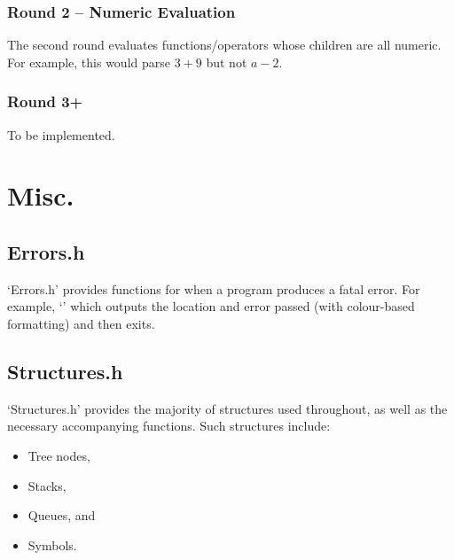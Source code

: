             \subsubsection{Round 2 -- Numeric Evaluation}
                The second round evaluates functions/operators whose children are all numeric. For example, this would parse $3 + 9$ but not $a - 2$. 

            \subsubsection{Round 3+}
                To be implemented.

    \section{Misc.}
        \subsection{Errors.h}
            `Errors.h' provides functions for when a program produces a fatal error. For example, `' which outputs the location and error passed (with colour-based formatting) and then exits. 

        \subsection{Structures.h}
            `Structures.h' provides the majority of structures used throughout, as well as the necessary accompanying functions. Such structures include:
            \begin{itemize}
                \item Tree nodes,
                \item Stacks,
                \item Queues, and
                \item Symbols.
            \end{itemize}
